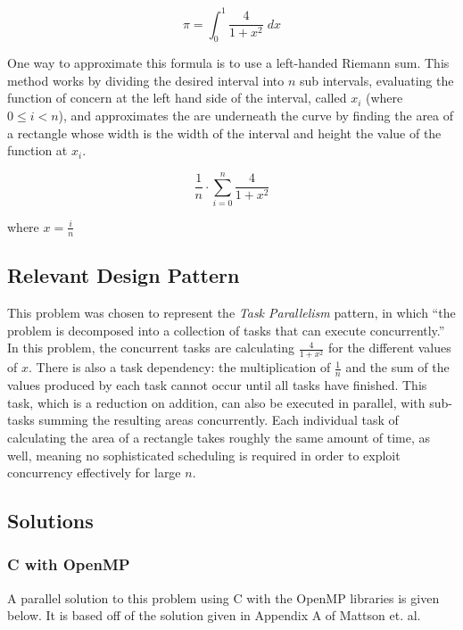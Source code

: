 \[\pi = \int_0^1 \frac{4}{1 + x^2} \; dx\]

One way to approximate this formula is to use a left-handed Riemann sum. 
This method works by dividing the desired interval into $n$ sub intervals, 
evaluating the function of concern at the left hand side of the interval, called $x_i$ (where $0 \le i < n$), 
and approximates the are underneath the curve by finding the area of a rectangle 
whose width is the width of the interval and height the value of the function at $x_i$.

\[\frac{1}{n} \cdot \sum_{i=0}^n \frac{4}{1 + x^2} \]

where $x = \frac{i}{n}$

\subsection{Relevant Design Pattern}
This problem was chosen to represent the \textit{Task Parallelism} pattern, 
in which ``the problem is decomposed into a collection of tasks that can execute concurrently.'' \cite{mass}
In this problem, the concurrent tasks are calculating $\frac{4}{1 + x^2}$ for the different values of $x$. 
There is also a task dependency: the multiplication of $\frac{1}{n}$ and the sum of the values produced by each task 
cannot occur until all tasks have finished. 
This task, which is a reduction on addition, can also be executed in parallel, 
with sub-tasks summing the resulting areas concurrently.
Each individual task of calculating the area of a rectangle takes roughly the same amount of time, as well, 
meaning no sophisticated scheduling is required in order to exploit concurrency effectively for large $n$.

\subsection{Solutions}
\subsubsection{C with OpenMP}
A parallel solution to this problem using C with the OpenMP libraries is given below. 
It is based off of the solution given in Appendix A of Mattson et. al. \cite{mass}

\begin{singlespacing}
\begin{small}

\end{small}
\end{singlespacing}

